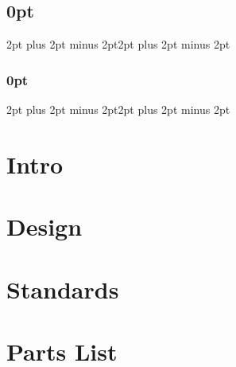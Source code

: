 \documentclass[10pt]{article}
\begin{document}
\setlength{\fboxrule}{.5mm}\setlength{\fboxsep}{1.2mm}
\newlength{\boxlength}\setlength{\boxlength}{\textwidth}
\addtolength{\boxlength}{-4mm}
\begin{center}
\end{center}

\titlespacing\subsection{0pt}{2pt plus 2pt minus 2pt}{2pt plus 2pt minus 2pt}
\titlespacing\subsubsection{0pt}{2pt plus 2pt minus 2pt}{2pt plus 2pt minus 2pt}

\section{Intro}

\section{Design}

\section{Standards}

\section{Parts List}
\end{document}
